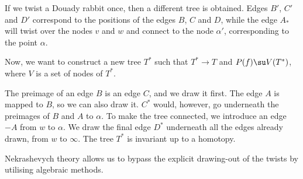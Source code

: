 \documentclass[11pt]{scrartcl}
\begin{document}
  If we twist a Douady rabbit once, then a different tree is obtained.
  Edges $B'$, $C'$ and $D'$ correspond to the positions of the edges
  $B$, $C$ and $D$, while the edge $A_{*}$ will twist over the nodes $v$
  and $w$ and connect to the node $\alpha'$, corresponding to the
  point $\alpha$.

  Now, we want to construct a new tree $T^{*}$ such that $T^{*} \to T$
  and $P(f) \su V(T^{*})$, where $V$ is a set of nodes of $T^{*}$.

  The preimage of an edge $B$ is an edge $C$, and we draw it first.
  The edge $A$ is mapped to $B$, so we can also draw it. $C^{*}$
  would, however, go underneath the preimages of $B$ and $A$ to
  $\alpha$. To make the tree connected, we introduce an edge $-A$ from
  $w$ to $\alpha$. We draw the final edge $D^{*}$ underneath all the
  edges already drawn, from $w$ to $\infty$. The tree $T^{*}$ is
  invariant up to a homotopy.

  \begin{note*}
  Nekrashevych theory allows us to bypass the explicit drawing-out of
  the twists by utilising algebraic methods.
  \end{note*}
  
\end{document}
